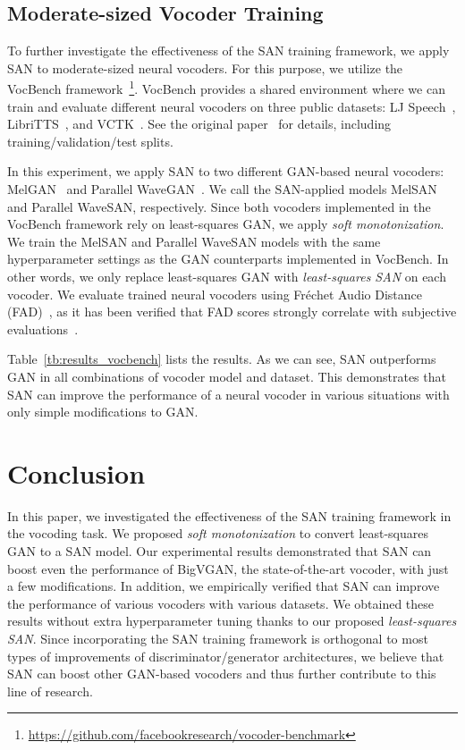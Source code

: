 \documentclass{article}
\begin{document}
\subsection{Moderate-sized Vocoder Training}

To further investigate the effectiveness of the SAN training framework, we apply SAN to moderate-sized neural vocoders. For this purpose, we utilize the VocBench framework~\cite{albadawy2023vocbench}\footnote{\url{https://github.com/facebookresearch/vocoder-benchmark}}. VocBench provides a shared environment where we can train and evaluate different neural vocoders on three public datasets: LJ Speech~\cite{ito2017ljspeech}, LibriTTS~\cite{zen2019libritts}, and VCTK~\cite{yamagishi2019vctk}. 
See the original paper~\cite{albadawy2023vocbench} for details, including training/validation/test splits.

In this experiment, we apply SAN to two different GAN-based neural vocoders: MelGAN~\cite{kumar2019melgan} and Parallel WaveGAN~\cite{yamamoto2020parallel}. We call the SAN-applied models MelSAN and Parallel WaveSAN, respectively. Since both vocoders implemented in the VocBench framework rely on least-squares GAN, we apply \textit{soft monotonization}. We train the MelSAN and Parallel WaveSAN models with the same hyperparameter settings as the GAN counterparts implemented in VocBench. In other words, we only replace least-squares GAN with \textit{least-squares SAN} on each vocoder. We evaluate trained neural vocoders using Fréchet Audio Distance (FAD)~\cite{kilgour2019frechet}, as it has been verified that FAD scores strongly correlate with subjective evaluations~\cite{albadawy2023vocbench}.

Table~\ref{tb:results_vocbench} lists the results. As we can see, SAN outperforms GAN in all combinations of vocoder model and dataset. This demonstrates that SAN can improve the performance of a neural vocoder in various situations with only simple modifications to GAN.

\section{Conclusion}
\label{sec:conclusion}

In this paper, we investigated the effectiveness of the SAN training framework in the vocoding task. We proposed \textit{soft monotonization} to convert least-squares GAN to a SAN model. Our experimental results demonstrated that SAN can boost even the performance of BigVGAN, the state-of-the-art vocoder, with just a few modifications. In addition, we empirically verified that SAN can improve the performance of various vocoders with various datasets. We obtained these results without extra hyperparameter tuning thanks to our proposed \textit{least-squares SAN}. Since incorporating the SAN training framework is orthogonal to most types of improvements of discriminator/generator architectures, we believe that SAN can boost other GAN-based vocoders and thus further contribute to this line of research.

\clearpage

\vfill\pagebreak


\end{document}
